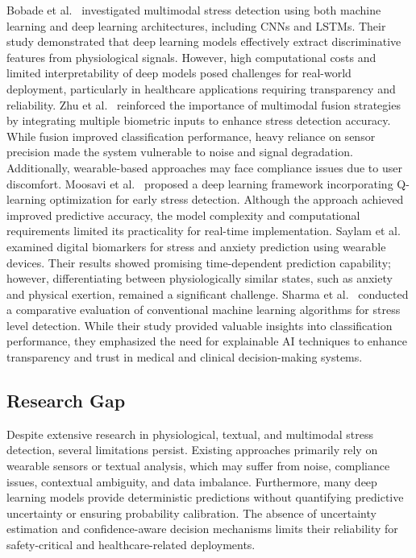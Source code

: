 \documentclass[conference]{IEEEtran}
\begin{document}
Bobade et al.~\cite{ref7} investigated multimodal stress detection using both machine learning and deep learning architectures, including CNNs and LSTMs. Their study demonstrated that deep learning models effectively extract discriminative features from physiological signals. However, high computational costs and limited interpretability of deep models posed challenges for real-world deployment, particularly in healthcare applications requiring transparency and reliability.
Zhu et al.~\cite{ref8} reinforced the importance of multimodal fusion strategies by integrating multiple biometric inputs to enhance stress detection accuracy. While fusion improved classification performance, heavy reliance on sensor precision made the system vulnerable to noise and signal degradation. Additionally, wearable-based approaches may face compliance issues due to user discomfort.
Moosavi et al.~\cite{ref9} proposed a deep learning framework incorporating Q-learning optimization for early stress detection. Although the approach achieved improved predictive accuracy, the model complexity and computational requirements limited its practicality for real-time implementation.
Saylam et al.~\cite{ref10} examined digital biomarkers for stress and anxiety prediction using wearable devices. Their results showed promising time-dependent prediction capability; however, differentiating between physiologically similar states, such as anxiety and physical exertion, remained a significant challenge.
Sharma et al.~\cite{ref11} conducted a comparative evaluation of conventional machine learning algorithms for stress level detection. While their study provided valuable insights into classification performance, they emphasized the need for explainable AI techniques to enhance transparency and trust in medical and clinical decision-making systems.

\subsection{Research Gap}

Despite extensive research in physiological, textual, and multimodal stress detection, several limitations persist. Existing approaches primarily rely on wearable sensors or textual analysis, which may suffer from noise, compliance issues, contextual ambiguity, and data imbalance. Furthermore, many deep learning models provide deterministic predictions without quantifying predictive uncertainty or ensuring probability calibration. The absence of uncertainty estimation and confidence-aware decision mechanisms limits their reliability for safety-critical and healthcare-related deployments.
\end{document}
